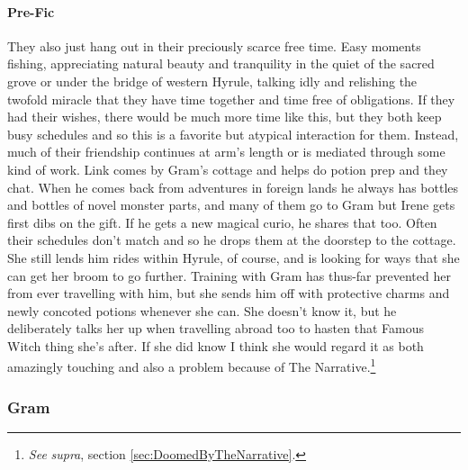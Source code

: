   \paragraph{Pre-Fic}They also just hang out in their preciously scarce free time. Easy moments fishing, appreciating natural beauty and tranquility in the quiet of the sacred grove or under the bridge of western Hyrule, talking idly and relishing the twofold miracle that they have time together and time free of obligations. If they had their wishes, there would be much more time like this, but they both keep busy schedules and so this is a favorite but atypical interaction for them. Instead, much of their friendship continues at arm's length or is mediated through some kind of work. Link comes by Gram's cottage and helps do potion prep and they chat. When he comes back from adventures in foreign lands he always has bottles and bottles of novel monster parts, and many of them go to Gram but Irene gets first dibs on the gift. If he gets a new magical curio, he shares that too. Often their schedules don't match and so he drops them at the doorstep to the cottage. She still lends him rides within Hyrule, of course, and is looking for ways that she can get her broom to go further. Training with Gram has thus-far prevented her from ever travelling with him, but she sends him off with protective charms and newly concoted potions whenever she can. She doesn't know it, but he deliberately talks her up when travelling abroad too to hasten that Famous Witch thing she's after. If she did know I think she would regard it as both amazingly touching and also a problem because of The Narrative.\footnote{\textit{See} \textit{supra}, section \ref{sec:DoomedByTheNarrative}.}

  \subsubsection{Gram}
